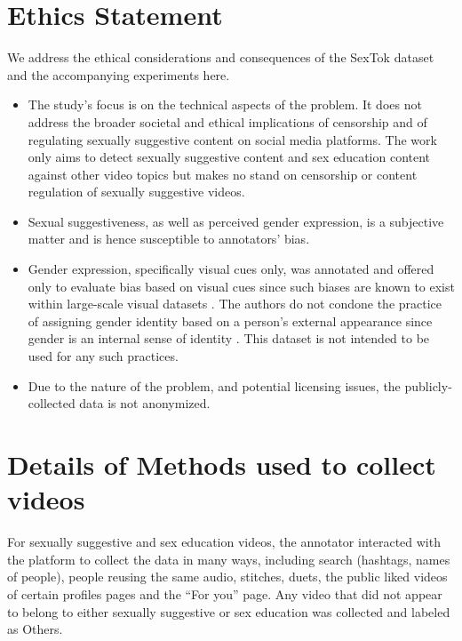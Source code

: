 \documentclass[11pt]{article}
\begin{document}
\section*{Ethics Statement}
We address the ethical considerations and consequences of the SexTok dataset and the accompanying experiments here.
\begin{itemize}
    \item The study's focus is on the technical aspects of the problem. It does not address the broader societal and ethical implications of censorship and of regulating sexually suggestive content on social media platforms. The work only aims to detect sexually suggestive content and sex education content against other video topics but makes no stand on censorship or content regulation of sexually suggestive videos. 
    \item Sexual suggestiveness, as well as perceived gender expression, is a subjective matter and is hence susceptible to annotators' bias.
    \item Gender expression, specifically visual cues only, was annotated and offered only to evaluate bias based on visual cues since such biases are known to exist within large-scale visual datasets \cite{meister2022gender}. The authors do not condone the practice of assigning gender identity based on a person's external appearance since gender is an internal sense of identity \cite{american2015guidelines}. This dataset is not intended to be used for any such practices.
    \item Due to the nature of the problem, and potential licensing issues, the publicly-collected data is not anonymized. 
\end{itemize}




\appendix

\section{Details of Methods used to collect videos}

For sexually suggestive and sex education videos, the annotator interacted with the platform to collect the data in many ways, including search (hashtags, names of people), people reusing the same audio, stitches, duets, the public liked videos of certain profiles pages and the ``For you'' page. Any video that did not appear to belong to either sexually suggestive or sex education was collected and labeled as Others. 
\end{document}
